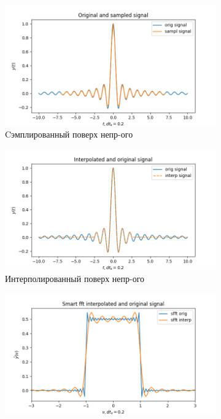 \documentclass[a4paper, 12pt]{article}
\begin{document}
    \begin{figure}[H]
        \centering
        \begin{subfigure}{0.45\textwidth}
            \centering
            \includegraphics[width=\linewidth]{1_sinc.png}
            \caption{Cэмплированный поверх непр-ого}
            \label{fig:sinc1}
        \end{subfigure}
        \hspace{5mm}
        \begin{subfigure}{0.45\textwidth}
            \centering
            \includegraphics[width=\linewidth]{1_isinc.png}
            \caption{Интерполированный поверх непр-ого}
            \label{fig:isinc1}
        \end{subfigure}
        \begin{subfigure}{0.45\textwidth}
            \centering
            \includegraphics[width=\linewidth]{1_fsinc.png}

\end{subfigure}
\end{figure}
\end{document}

